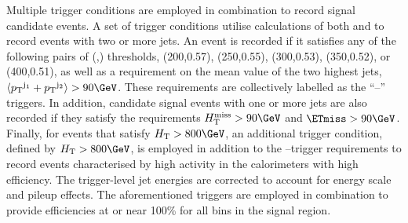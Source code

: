 

Multiple trigger conditions are employed in combination to record
signal candidate events. A set of trigger conditions utilise
calculations of both \scalht and \alphat to record events with two or
more jets. An event is recorded if it satisfies any of the following
pairs of (\scalht,\alphat) thresholds, (200,0.57), (250,0.55),
(300,0.53), (350,0.52), or (400,0.51), as well as a requirement on the
mean value of the two highest \Pt jets, $\langle\Pt^{\mathrm{j_1}} +
\Pt^{\mathrm{j_2}}\rangle > 90\GeV$. These requirements are collectively
labelled as the ``\scalht--\alphat'' triggers. In addition, candidate
signal events with one or more jets are also recorded if they satisfy
the requirements $\HTmiss > 90\GeV$ and $\ETmiss > 90\GeV$. Finally,
for events that satisfy $\scalht > 800\GeV$, an additional trigger
condition, defined by $\scalht > 800\GeV$, is employed in addition to
the \scalht--\alphat trigger requirements to record events
characterised by high activity in the calorimeters with high
efficiency. The trigger-level jet energies are corrected to account
for energy scale and pileup effects. The aforementioned triggers are
employed in combination to provide efficiencies at or near 100\% for
all bins in the signal region.

